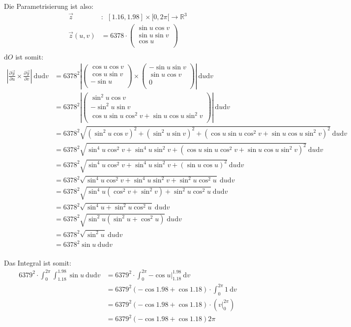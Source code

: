 \documentclass[10pt,a4paper,parskip=half]{scrartcl}
\newcommand{\vecthree}[3]{\begin{pmatrix}#1\\#2\\#3\\\end {pmatrix}}
\begin{document}
Die Parametrisierung ist also:
\begin{align*}
\vec z&:~~ [1.16,1.98] \times [0,2\pi[ \to \mathbb{R}^3\\
\vec z(u,v) &= 6378 \cdot \vecthree{\sin u \cos v}{\sin u \sin v}{\cos u} \\
\end{align*}
$\mathrm d O$ ist somit:
\begin{align*}
\left|\frac{\partial \vec y}{\partial u} \times \frac{\partial \vec y}{\partial v}\right| ~ \mathrm d u \mathrm d v&= 6378^2 \left|\vecthree{\cos u \cos v}{\cos u \sin v}{-\sin u} \times \vecthree{-\sin u \sin v}{\sin u \cos v}{0}\right| ~ \mathrm d u \mathrm d v\\
&= 6378^2 \left| \vecthree{\sin^2 u \cos v}{-\sin^2 u \sin v}{\cos u \sin u \cos^2 v + \sin u \cos u \sin^2 v} \right|~ \mathrm d u \mathrm d v\\
&= 6378^2 \sqrt{\left(\sin^2 u \cos v\right)^2 + \left(\sin^2 u \sin v\right)^2 + \left(\cos u \sin u \cos^2 v + \sin u \cos u \sin^2 v\right)^2}~ \mathrm d u \mathrm d v\\
&= 6378^2 \sqrt{\sin^4 u \cos^2 v + \sin^4 u \sin^2 v + \left(\cos u \sin u \cos^2 v + \sin u \cos u \sin^2 v\right)^2}~ \mathrm d u \mathrm d v\\
&= 6378^2 \sqrt{\sin^4 u \cos^2 v + \sin^4 u \sin^2 v + \left(\sin u \cos u\right)^2}~ \mathrm d u \mathrm d v\\
&= 6378^2 \sqrt{\sin^4 u \cos^2 v + \sin^4 u \sin^2 v + \sin^2 u \cos^2 u}~ \mathrm d u \mathrm d v\\
&= 6378^2 \sqrt{\sin^4 u\left(\cos^2 v + \sin^2 v\right) + \sin^2 u \cos^2 u}~ \mathrm d u \mathrm d v\\
&= 6378^2 \sqrt{\sin^4 u+ \sin^2 u \cos^2 u}~ \mathrm d u \mathrm d v\\
&= 6378^2 \sqrt{\sin^2 u \left(\sin^2 u +\cos^2 u\right)}~ \mathrm d u \mathrm d v\\
&= 6378^2 \sqrt{\sin^2 u}~ \mathrm d u \mathrm d v\\
&= 6378^2 \sin u~ \mathrm d u \mathrm d v\\
\end{align*}

Das Integral ist somit:
\begin{align*}
6379^2 \cdot \int_0^{2\pi} \int_{1.18}^{1.98} \sin u ~ \mathrm d u \mathrm d v &= 6379^2 \cdot \int_0^{2\pi} \left. -\cos u \right|_{1.18}^{1.98} ~ \mathrm d v\\
&= 6379^2 \left(-\cos 1.98 + \cos 1.18\right) \cdot \int_0^{2\pi}1~ \mathrm d v \\
&= 6379^2 \left(-\cos 1.98 + \cos 1.18\right) \cdot \left(\left. v \right|_0^{2\pi} \right) \\
&= 6379^2 \left(-\cos 1.98 + \cos 1.18\right) 2\pi \\
\end{align*}
\end{document}
